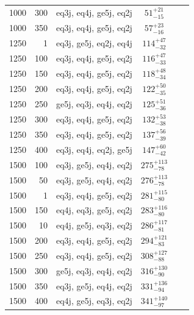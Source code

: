 \begin{table}
\begin{tabular}{rrcccc}
     1000 & 300 & eq3j, eq4j, ge5j, eq2j & $51_{-15}^{+21}$       \\ %
     1000 & 350 & eq3j, eq4j, ge5j, eq2j & $57_{-16}^{+23}$       \\ %
     1250 &   1 & eq3j, ge5j, eq2j, eq4j & $114_{-32}^{+47}$      \\ %
     1250 & 100 & eq3j, eq4j, ge5j, eq2j & $116_{-33}^{+47}$      \\ %
     1250 & 150 & eq3j, eq4j, ge5j, eq2j & $118_{-34}^{+48}$      \\ %
     1250 & 200 & eq3j, eq4j, ge5j, eq2j & $122_{-35}^{+50}$      \\ %
     1250 & 250 & ge5j, eq3j, eq4j, eq2j & $125_{-36}^{+51}$      \\ %
     1250 & 300 & eq3j, eq4j, ge5j, eq2j & $132_{-38}^{+53}$      \\ %
     1250 & 350 & eq3j, eq4j, ge5j, eq2j & $137_{-39}^{+56}$      \\ %
     1250 & 400 & eq3j, eq4j, eq2j, ge5j & $147_{-42}^{+60}$      \\ %
     1500 & 100 & eq3j, ge5j, eq4j, eq2j & $275_{-78}^{+113}$     \\ %
     1500 &  50 & eq3j, ge5j, eq4j, eq2j & $276_{-78}^{+113}$     \\ %
     1500 &   1 & eq3j, eq4j, ge5j, eq2j & $281_{-80}^{+115}$     \\ %
     1500 & 150 & eq4j, eq3j, ge5j, eq2j & $283_{-80}^{+116}$     \\ %
     1500 &  10 & eq4j, ge5j, eq3j, eq2j & $286_{-81}^{+117}$     \\ %
     1500 & 200 & eq3j, eq4j, ge5j, eq2j & $294_{-83}^{+121}$     \\ %
     1500 & 250 & eq3j, eq4j, ge5j, eq2j & $308_{-88}^{+127}$     \\ %
     1500 & 300 & ge5j, eq3j, eq4j, eq2j & $316_{-90}^{+130}$     \\ %
     1500 & 350 & eq3j, ge5j, eq4j, eq2j & $331_{-94}^{+136}$     \\ %
     1500 & 400 & eq4j, ge5j, eq3j, eq2j & $341_{-97}^{+140}$     \\ %


\end{tabular}
\end{table}
